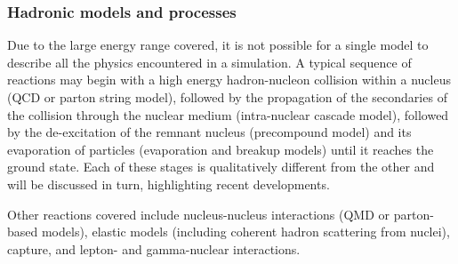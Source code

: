 









\subsubsection{Hadronic models and processes}\label{sec:models}
Due to the large energy range covered, it is not possible for a single model to
describe all the physics encountered in a simulation.  A typical sequence of 
reactions may begin with a high energy hadron-nucleon collision within a nucleus
(QCD or parton string model), followed by the propagation of the secondaries of 
the collision through the nuclear medium (intra-nuclear cascade model), followed
by the de-excitation of the remnant nucleus (precompound model) and its 
evaporation of particles (evaporation and breakup models) until it reaches the 
ground state.  Each of these stages is qualitatively different from the other 
and will be discussed in turn, highlighting recent developments. 

Other reactions covered include nucleus-nucleus interactions (QMD or 
parton-based models), elastic models  (including coherent hadron scattering 
from nuclei), capture, and lepton- and gamma-nuclear interactions.


  \label{had:string}
 \label{had:cascade}
 
 \label{had:deexcitation}



